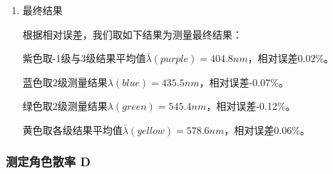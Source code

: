 \documentclass[dvipsnames, svgnames,a4paper,11pt]{article}
\begin{document}
\begin{enumerate}
		\item 最终结果
		
		根据相对误差，我们取如下结果为测量最终结果：
		
		紫色取-1级与3级结果平均值$\bar{\lambda}(purple)=404.8nm$，相对误差0.02\%。
		
		蓝色取2级测量结果$\lambda(blue)=435.5nm$，相对误差-0.07\%。
		
		绿色取2级测量结果$\lambda(green)=545.4nm$，相对误差-0.12\%。
		
		黄色取各级结果平均值$\bar{\lambda}(yellow)=578.6nm$，相对误差0.06\%。				
	\end{enumerate}
	
	\subsubsection{测定角色散率 D}
\end{document}
